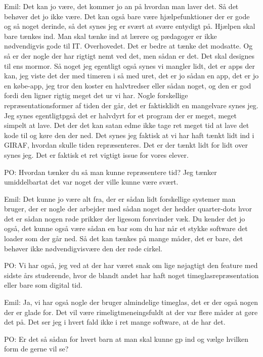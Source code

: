 Emil:
Det kan jo være, det kommer jo an på hvordan man laver det.
Så det behøver det jo ikke være.
Det kan også bare være hjælpefunktioner der er gode og så noget derinde, så det synes jeg er svært at svære entydigt på.
Hjælpen skal bare tænkes ind.
Man skal tænke ind at lærere og pædagoger er ikke nødvendigvis gode til IT.
Overhovedet.
Det er bedre at tænke det modsatte. 
Og så er der nogle der har rigtigt nemt ved det, men sådan er det.
Det skal designes til ens mormor.
Så noget jeg egentligt også synes vi mangler lidt, det er apps der kan, jeg viste det der med timeren i så med uret, det er jo sådan en app, det er jo en købe-app, jeg tror den koster en halvtredser eller sådan noget, og den er god fordi den ligner rigtig meget det ur vi har.
Nogle forskellige repræsentationsformer af tiden der går, det er faktisklidt en mangelvare synes jeg.    
Jeg synes egentligtpgså det er halvdyrt for et program der er meget, meget simpelt at lave. 
Det der det kan satan edme ikke tage ret meget tid at lave det kode til og køre den der ned.
Det synes jeg faktisk at vi har haft tænkt lidt ind i GIRAF, hvordan skulle tiden repræsenteres.
Det er der tænkt lidt for lidt over synes jeg.  
Det er faktisk et ret vigtigt issue for vores elever. 

PO:
Hvordan tænker du så man kunne repræsentere tid? 
Jeg tænker umiddelbartat det var noget der ville kunne være svært.

Emil:
Det kunne jo være alt fra, der er sådan lidt forskellige systemer man bruger, der er nogle der arbejder med sådan noget der hedder quarter-dots hvor det er sådan nogen røde prikker der ligesom forsvinder væk.
Du kender det jo også, det kunne også være sådan en bar som du har når et stykke software det loader som der går ned.    
Så det kan tænkes på mange måder, det er bare, det behøver ikke nødvendigvisvære den der røde cirkel.
 
PO:
Vi har også, jeg ved at der har været snak om lige nøjagtigt den feature med sidste års studerende, hvor de blandt andet har haft noget timeglasrepræsentation eller bare som digital tid.

Emil:
Ja, vi har også nogle der bruger almindelige timeglas, det er der også nogen der er glade for.
Det vil være rimeligtmeneingsfuldt at der var flere måder at gøre det på.
Det ser jeg i hvert fald ikke i ret mange software, at de har det. 

PO:
Er det så sådan for hvert barn at man skal kunne gp ind og vælge hvilken form de gerne vil se?

